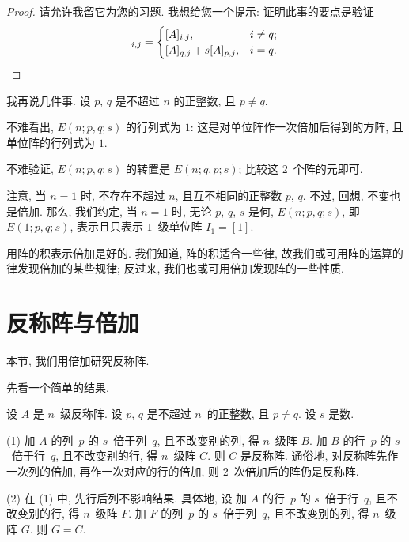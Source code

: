 \documentclass[../libro.tex]{subfiles}
\begin{document}
\begin{proof}
    请允许我留它为您的习题.
    我想给您一个提示:
    证明此事的要点是验证
    \begin{equation*}
        [E(m; q, p; s) A]_{i,j} =
        \begin{cases}
            [A]_{i,j},              & i \neq q; \\
            [A]_{q,j} + s[A]_{p,j}, & i = q.
        \end{cases}
        \qedhere
    \end{equation*}
\end{proof}

我再说几件事.
设 \(p\), \(q\) 是不超过 \(n\) 的正整数,
且 \(p \neq q\).

不难看出, \(E(n; p, q; s)\) 的行列式为 \(1\):
这是对单位阵作一次倍加后得到的方阵,
且单位阵的行列式为 \(1\).

不难验证, \(E(n; p, q; s)\) 的转置是
\(E(n; q, p; s)\);
比较这 \(2\)~个阵的元即可.

注意,
当 \(n = 1\) 时, 不存在不超过 \(n\),
且互不相同的正整数 \(p\), \(q\).
不过, 回想, 不变也是倍加.
那么, 我们约定, 当 \(n = 1\) 时,
无论 \(p\), \(q\), \(s\) 是何,
\(E(n; p, q; s)\),
即 \(E(1; p, q; s)\),
表示且只表示 \(1\)~级单位阵 \(I_1 = [1]\).

用阵的积表示倍加是好的.
我们知道, 阵的积适合一些律,
故我们或可用阵的运算的律发现倍加的某些规律;
反过来, 我们也或可用倍加发现阵的一些性质.

\section{反称阵与倍加}

本节, 我们用倍加研究反称阵.

先看一个简单的结果.

\begin{theorem}
    设 \(A\) 是 \(n\)~级反称阵.
    设 \(p\), \(q\) 是不超过 \(n\)~的正整数,
    且 \(p \neq q\).
    设 \(s\) 是数.

    (1)
    加 \(A\) 的列~\(p\) 的 \(s\)~倍于列~\(q\),
    且不改变别的列, 得 \(n\)~级阵 \(B\).
    加 \(B\) 的行~\(p\) 的 \(s\)~倍于行~\(q\),
    且不改变别的行, 得 \(n\)~级阵 \(C\).
    则 \(C\) 是反称阵.
    通俗地,
    对反称阵先作一次列的倍加,
    再作一次对应的行的倍加,
    则 \(2\)~次倍加后的阵仍是反称阵.

    (2)
    在 (1) 中, 先行后列不影响结果.
    具体地, 设%
    加 \(A\) 的行~\(p\) 的 \(s\)~倍于行~\(q\),
    且不改变别的行, 得 \(n\)~级阵 \(F\).
    加 \(F\) 的列~\(p\) 的 \(s\)~倍于列~\(q\),
    且不改变别的列, 得 \(n\)~级阵 \(G\).
    则 \(G = C\).
\end{theorem}
\end{document}
